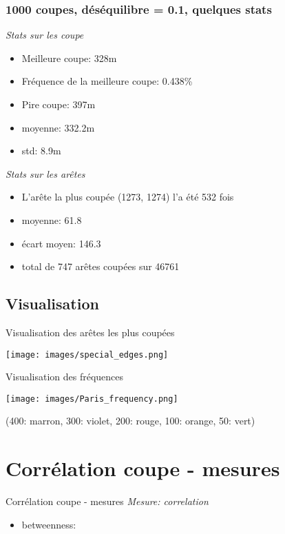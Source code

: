 \documentclass[aspectratio=169]{beamer}
\begin{document}
    \begin{frame}
        \frametitle{1000 coupes, déséquilibre = 0.1, quelques stats}
        \emph{Stats sur les coupe}
        \begin{itemize}
            \item Meilleure coupe: 328m
            \item Fréquence de la meilleure coupe: 0.438\%
            \item Pire coupe: 397m
            \item moyenne: 332.2m
            \item std: 8.9m
        \end{itemize}
        \emph{Stats sur les arêtes}
        \begin{itemize}
            \item L'arête la plus coupée (1273, 1274) l'a été 532 fois
            \item moyenne: 61.8
            \item écart moyen: 146.3
            \item total de 747 arêtes coupées sur 46761
        \end{itemize}
    \end{frame}

    \subsection{Visualisation}
    \begin{frame}{Visualisation des arêtes les plus coupées}
        \begin{center}
            \texttt{[image: images/special\_edges.png]}
        \end{center}
    \end{frame}

    \begin{frame}{Visualisation des fréquences}
    \begin{center}
        \texttt{[image: images/Paris\_frequency.png]}
    \end{center}
    (400: marron, 300: violet, 200: rouge, 100: orange, 50: vert)
    \end{frame}

    \section{Corrélation coupe - mesures}

    \begin{frame}{Corrélation coupe - mesures}
    \emph{Mesure: correlation}
    \begin{itemize}
        \item betweenness:  
    \end{itemize}
    \end{frame}
\end{document}
